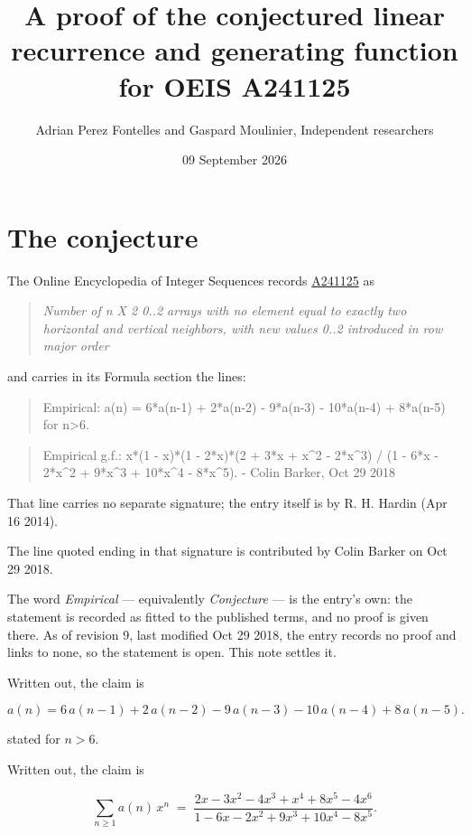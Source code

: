 \documentclass[11pt]{article}
\title{A proof of the conjectured linear recurrence and generating function for OEIS A241125}
\author{Adrian Perez Fontelles and Gaspard Moulinier, Independent researchers}
\date{09 September 2026}
\theoremstyle{definition}
\begin{document}
\maketitle
\section{The conjecture}

The Online Encyclopedia of Integer Sequences records \href{https://oeis.org/A241125}{A241125} as

\begin{quote}\itshape Number of n X 2 0..2 arrays with no element equal to exactly two horizontal and vertical neighbors, with new values 0..2 introduced in row major order\end{quote}

and carries in its Formula section the lines:

\begin{quote}\ttfamily Empirical: a(n) = 6*a(n-1) + 2*a(n-2) -  9*a(n-3) - 10*a(n-4) + 8*a(n-5) for n>6.\end{quote}

\begin{quote}\ttfamily Empirical g.f.: x*(1 - x)*(1 - 2*x)*(2 + 3*x + x\textasciicircum{}2 - 2*x\textasciicircum{}3) / (1 - 6*x - 2*x\textasciicircum{}2 + 9*x\textasciicircum{}3 + 10*x\textasciicircum{}4 - 8*x\textasciicircum{}5). - Colin Barker, Oct 29 2018\end{quote}

That line carries no separate signature; the entry itself is by R. H. Hardin (Apr 16 2014).

The line quoted ending in that signature is contributed by Colin Barker on Oct 29 2018.

The word {\itshape Empirical} --- equivalently {\itshape Conjecture} --- is the entry's own: the statement is recorded as fitted to the published terms, and no proof is given there. As of revision 9, last modified Oct 29 2018, the entry records no proof and links to none, so the statement is open. This note settles it.

Written out, the claim is

\[a(n) = 6\,a(n-1) + 2\,a(n-2) - 9\,a(n-3) - 10\,a(n-4) + 8\,a(n-5).\]

stated for $n > 6$.

Written out, the claim is

\[\sum_{n \ge 1} a(n)\,x^n \;=\; \frac{2x - 3x^{2} - 4x^{3} + x^{4} + 8x^{5} - 4x^{6}}{1 - 6x - 2x^{2} + 9x^{3} + 10x^{4} - 8x^{5}}.\]
\end{document}
